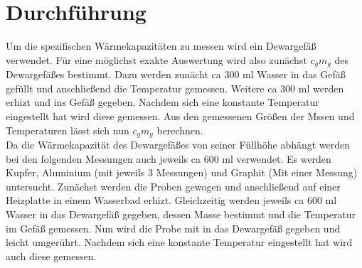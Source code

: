 \section{Durchführung}
\label{sec:Durchführung}
Um die spezifischen Wärmekapazitäten zu messen wird
ein Dewargefäß verwendet. Für eine möglichst exakte
Auswertung wird also zunächst $c_g m_g$ des
Dewargefäßes bestimmt. Dazu werden zunächt ca 300 ml 
Wasser in das Gefäß gefüllt und anschließend die
Temperatur gemessen. Weitere ca 300 ml
werden erhizt und ins Gefäß gegeben.
Nachdem sich eine konstante Temperatur eingestellt hat wird diese gemessen.
Aus den gemessenen Größen der Mssen und Temperaturen lässt sich nun
$c_g m_g$ berechnen.\\


\noindent Da die Wärmekapazität des Dewargefäßes von seiner Füllhöhe abhängt
werden bei den folgenden Messungen auch jeweils ca 600 ml verwendet.
Es werden Kupfer, Aluminium (mit jeweils 3 Messungen)
und Graphit (Mit einer Messung) untersucht.
Zunächst werden die Proben gewogen und anschließend auf
einer Heizplatte in einem Wasserbad erhizt. 
Gleichzeitig werden jeweils ca 600 ml Wasser in
das Dewargefäß gegeben, dessen Masse bestimmt und die Temperatur im Gefäß gemessen.
Nun wird die Probe mit in das Dewargefäß gegeben 
und leicht umgerührt. Nachdem sich eine konstante Temperatur eingestellt hat wird auch diese gemessen.
